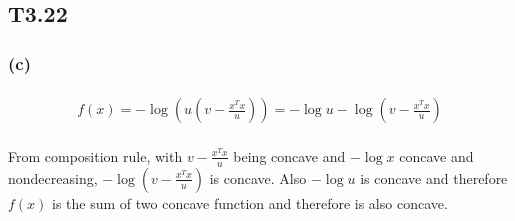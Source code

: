 \subsection*{T3.22}
\subsubsection*{(c)}
\paragraph{}
\begin{align*}
	f(x)=-\log(u(v-\frac{x^Tx}{u})) = -\log u - \log(v-\frac{x^Tx}{u})
\end{align*}
\paragraph{}
From composition rule, with $v-\frac{x^Tx}{u}$ being concave and $-\log x$ concave and nondecreasing, $-\log(v-\frac{x^Tx}{u})$ is concave. Also $-\log u $ is concave and therefore $f(x)$ is the sum of two concave function and therefore is also concave. 